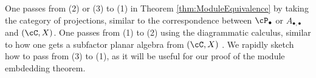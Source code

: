 \documentclass[11pt]{article}
\theoremstyle{plain}
\theoremstyle{definition}
\newcommand{\nn}[1]{\textcolor{red}{[[#1]]}}
\begin{document}
One passes from (2) or (3) to (1) in Theorem \ref{thm:ModuleEquivalence} by taking the category of projections, similar to the correspondence between $\cP_\bullet$ or $A_{\bullet,\bullet}$ and $(\cC, X)$.
One passes from (1) to (2) using the diagrammatic calculus, similar to how one gets a subfactor planar algebra from $(\cC, X)$ \cite{MR2811311,1808.00323}.
We rapidly sketch how to pass from (3) to (1), as it will be useful for our proof of the module embdedding theorem.


\end{document}
